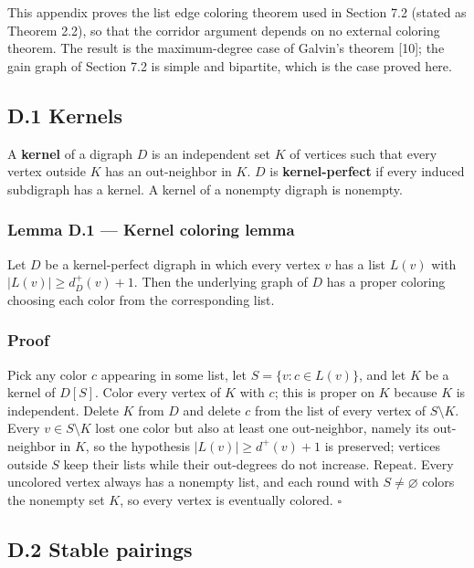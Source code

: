 \documentclass[
  11pt,
]{article}
\begin{document}
This appendix proves the list edge coloring theorem used in Section 7.2
(stated as Theorem 2.2), so that the corridor argument depends on no
external coloring theorem. The result is the maximum-degree case of
Galvin's theorem {[}10{]}; the gain graph of Section 7.2 is simple and
bipartite, which is the case proved here.

\subsection{D.1 Kernels}\label{d.1-kernels}

A \textbf{kernel} of a digraph \(D\) is an independent set \(K\) of
vertices such that every vertex outside \(K\) has an out-neighbor in
\(K\). \(D\) is \textbf{kernel-perfect} if every induced subdigraph has
a kernel. A kernel of a nonempty digraph is nonempty.

\subsubsection{Lemma D.1 --- Kernel coloring
lemma}\label{lemma-d.1-kernel-coloring-lemma}

Let \(D\) be a kernel-perfect digraph in which every vertex \(v\) has a
list \(L(v)\) with \(|L(v)|\ge d^+_D(v)+1\). Then the underlying graph
of \(D\) has a proper coloring choosing each color from the
corresponding list.

\subsubsection{Proof}\label{proof-7}

Pick any color \(c\) appearing in some list, let \(S=\{v:c\in L(v)\}\),
and let \(K\) be a kernel of \(D[S]\). Color every vertex of \(K\) with
\(c\); this is proper on \(K\) because \(K\) is independent. Delete
\(K\) from \(D\) and delete \(c\) from the list of every vertex of
\(S\setminus K\). Every \(v\in S\setminus K\) lost one color but also at
least one out-neighbor, namely its out-neighbor in \(K\), so the
hypothesis \(|L(v)|\ge d^+(v)+1\) is preserved; vertices outside \(S\)
keep their lists while their out-degrees do not increase. Repeat. Every
uncolored vertex always has a nonempty list, and each round with
\(S\ne\varnothing\) colors the nonempty set \(K\), so every vertex is
eventually colored. \(\square\)

\subsection{D.2 Stable pairings}\label{d.2-stable-pairings}
\end{document}
